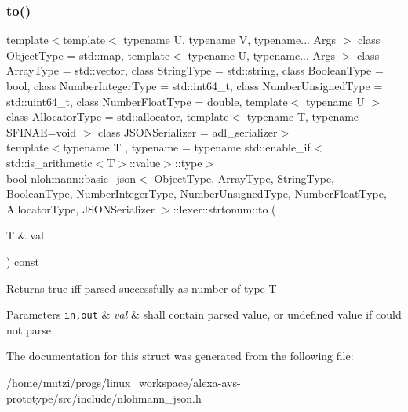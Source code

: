\subsubsection{\texorpdfstring{to()}{to()}}
{\footnotesize\ttfamily template$<$template$<$ typename U, typename V, typename... Args $>$ class Object\+Type = std\+::map, template$<$ typename U, typename... Args $>$ class Array\+Type = std\+::vector, class String\+Type  = std\+::string, class Boolean\+Type  = bool, class Number\+Integer\+Type  = std\+::int64\+\_\+t, class Number\+Unsigned\+Type  = std\+::uint64\+\_\+t, class Number\+Float\+Type  = double, template$<$ typename U $>$ class Allocator\+Type = std\+::allocator, template$<$ typename T, typename S\+F\+I\+N\+A\+E=void $>$ class J\+S\+O\+N\+Serializer = adl\+\_\+serializer$>$ \\
template$<$typename T , typename  = typename std\+::enable\+\_\+if$<$std\+::is\+\_\+arithmetic$<$\+T$>$\+::value$>$\+::type$>$ \\
bool \hyperlink{classnlohmann_1_1basic__json}{nlohmann\+::basic\+\_\+json}$<$ Object\+Type, Array\+Type, String\+Type, Boolean\+Type, Number\+Integer\+Type, Number\+Unsigned\+Type, Number\+Float\+Type, Allocator\+Type, J\+S\+O\+N\+Serializer $>$\+::lexer\+::strtonum\+::to (\begin{DoxyParamCaption}\item[{T \&}]{val }\end{DoxyParamCaption}) const\hspace{0.3cm}{\ttfamily [inline]}}

\begin{DoxyReturn}{Returns}
true iff parsed successfully as number of type T
\end{DoxyReturn}

\begin{DoxyParams}[1]{Parameters}
\mbox{\tt in,out}  & {\em val} & shall contain parsed value, or undefined value if could not parse \\
\hline
\end{DoxyParams}


The documentation for this struct was generated from the following file\+:\begin{DoxyCompactItemize}
\item 
/home/mutzi/progs/linux\+\_\+workspace/alexa-\/avs-\/prototype/src/include/nlohmann\+\_\+json.\+h\end{DoxyCompactItemize}
